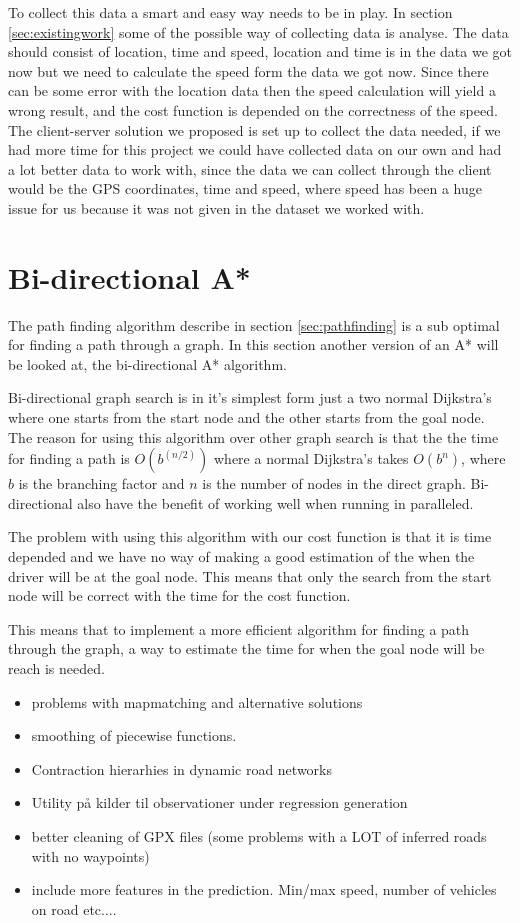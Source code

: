 To collect this data a smart and easy way needs to be in play. In section \ref{sec:existingwork} some of the possible way of collecting data is analyse. The data should consist of location, time and speed, location and time is in the data we got now but we need to calculate the speed form the data we got now. Since there can be some error with the location data then the speed calculation will yield a wrong result, and the cost function is depended on the correctness of the speed.
The client-server solution we proposed is set up to collect the data needed, if we had more time for this project we could have collected data on our own and had a lot better data to work with, since the data we can collect through the client would be the GPS coordinates, time and speed, where speed has been a huge issue for us because it was not given in the dataset we worked with.

\section{Bi-directional A*} \label{algorithms}
The path finding algorithm describe in section \ref{sec:pathfinding} is a sub optimal for finding a path through a graph. In this section another version of an A* will be looked at, the bi-directional A* algorithm.

Bi-directional graph search is in it's simplest form just a two normal Dijkstra’s where one starts from the start node and the other starts from the goal node.
The reason for using this algorithm over other graph search is that the the time for finding a path is $O(b^{(n/2)})$ where a normal Dijkstra’s takes $O(b^{n})$, where $b$ is the branching factor and $n$ is the number of nodes in the direct graph. Bi-directional also have the benefit of working well when running in paralleled.

The problem with using this algorithm with our cost function is that it is time depended and we have no way of making a good estimation of the when the driver will be at the goal node. This means that only the search from the start node will be correct with the time for the cost function.

This means that to implement a more efficient algorithm for finding a path through the graph, a way to estimate the time for when the goal node will be reach is needed.


\begin{itemize}
	\item problems with mapmatching and alternative solutions
	\item smoothing of piecewise functions.
	\item Contraction hierarhies in dynamic road networks
	\item Utility på kilder til observationer under regression generation
	\item better cleaning of GPX files (some problems with a LOT of inferred roads with no waypoints)
	\item include more features in the prediction. Min/max speed, number of vehicles on road etc....
\end{itemize}

